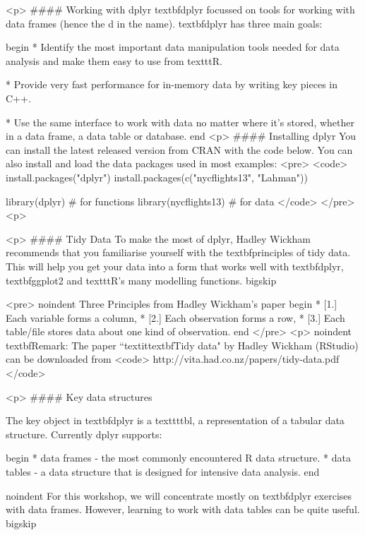 	
	<p>
#### {Working with dplyr} textbf{dplyr} focussed on tools for working with data frames (hence the d in the name). textbf{dplyr} has three main goals:
	
	
	begin{ }
		         * Identify the most important data manipulation tools needed for data analysis and make them easy to use from texttt{R}.
		
		         * Provide very fast performance for in-memory data by writing key pieces in C++.
		
		         * Use the same interface to work with data no matter where it's stored, whether in a data frame, a data table or database.
	end{ }
	<p>
#### {Installing dplyr}
	You can install the latest released version from CRAN with the code below.
	You can also install and load the data packages used in most examples: 
	<pre>
		<code>
		install.packages("dplyr")
		install.packages(c("nycflights13", "Lahman"))
		
		library(dplyr) # for functions
		library(nycflights13) # for data
		</code>
	</pre>
<p>
	
	<p>
#### {Tidy Data}
	To make the most of dplyr, Hadley Wickham recommends that you familiarise yourself with the textbf{principles of tidy data}. This will help you get your data into a form that works well with textbf{dplyr}, textbf{ggplot2} and texttt{R}'s many modelling functions.
	bigskip
	
	<pre>
		noindent Three Principles from Hadley Wickham's paper
		begin{ }
			        * [1.] Each variable forms a column, 
			        * [2.] Each observation forms a row, 
			        * [3.] Each table/file stores data about one kind of observation.
		end{ }
	</pre>
<p>
	noindent textbf{Remark:}  The paper ``textit{textbf{Tidy data}}" by Hadley Wickham (RStudio) can be downloaded from 
	<code>
	http://vita.had.co.nz/papers/tidy-data.pdf
	</code>
	
	
	<p>
#### {Key data structures}
	
	The key object in textbf{dplyr} is a texttt{tbl}, a representation of a tabular data structure. Currently dplyr supports:
	
	begin{ }
		         * data frames - the  most commonly encountered R data structure. 
		         * data tables - a data structure that is designed for intensive data analysis.
	end{ }
	
	noindent For this workshop, we will concentrate mostly on textbf{dplyr} exercises with data frames. However, learning to work with data tables can be quite useful.
	bigskip
	
